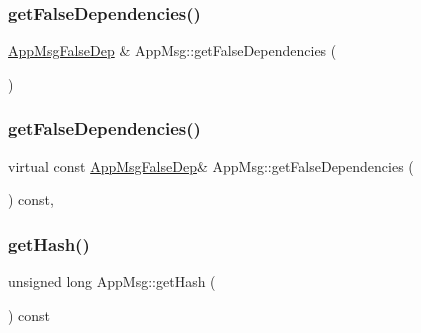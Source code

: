 \mbox{\label{classAppMsg_a0578104e6c8983ba88270192b263e3c9}} 
\subsubsection{\texorpdfstring{get\+False\+Dependencies()}{getFalseDependencies()}\hspace{0.1cm}{\footnotesize\ttfamily [1/2]}}
{\footnotesize\ttfamily \hyperlink{AppMsg__m_8h_a2b8cadfd13c916ddccf5a213ca34d8ee}{App\+Msg\+False\+Dep} \& App\+Msg\+::get\+False\+Dependencies (\begin{DoxyParamCaption}{ }\end{DoxyParamCaption})\hspace{0.3cm}{\ttfamily [virtual]}}

\mbox{\label{classAppMsg_aa9c4237b7fafc07ee9ba6d798941cc06}} 
\subsubsection{\texorpdfstring{get\+False\+Dependencies()}{getFalseDependencies()}\hspace{0.1cm}{\footnotesize\ttfamily [2/2]}}
{\footnotesize\ttfamily virtual const \hyperlink{AppMsg__m_8h_a2b8cadfd13c916ddccf5a213ca34d8ee}{App\+Msg\+False\+Dep}\& App\+Msg\+::get\+False\+Dependencies (\begin{DoxyParamCaption}{ }\end{DoxyParamCaption}) const\hspace{0.3cm}{\ttfamily [inline]}, {\ttfamily [virtual]}}

\mbox{\label{classAppMsg_a59f818e49bf28c2fd494e6668ef13367}} 
\subsubsection{\texorpdfstring{get\+Hash()}{getHash()}}
{\footnotesize\ttfamily unsigned long App\+Msg\+::get\+Hash (\begin{DoxyParamCaption}{ }\end{DoxyParamCaption}) const\hspace{0.3cm}{\ttfamily [virtual]}}

